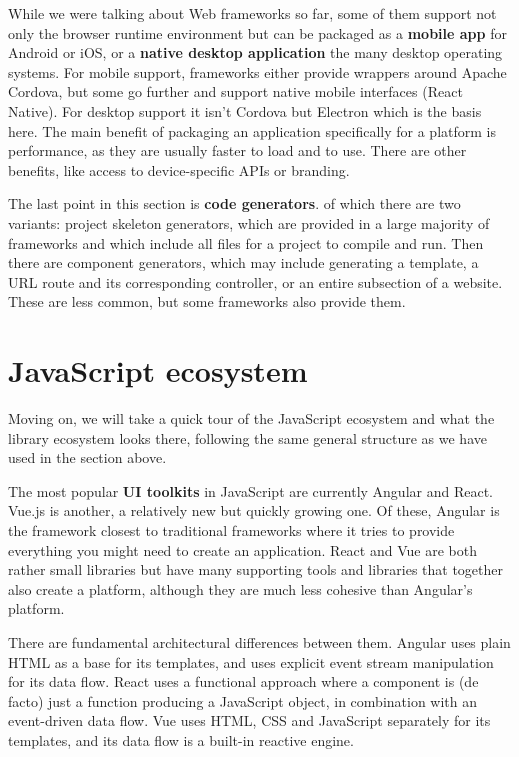 \documentclass[english,odsaz]{fitthesis}
\begin{document}
While we were talking about Web frameworks so far, some of them support not only
the browser runtime environment but can be packaged as a \textbf{mobile app} for Android
or iOS, or a \textbf{native desktop application} the many desktop operating systems. For
mobile support, frameworks either provide wrappers around Apache Cordova, but
some go further and support native mobile interfaces (React Native). For desktop
support it isn't Cordova but Electron which is the basis here. The main benefit
of packaging an application specifically for a platform is performance, as they
are usually faster to load and to use. There are other benefits, like access to
device-specific APIs or branding.

The last point in this section is \textbf{code generators}. of which there are two
variants: project skeleton generators, which are provided in a large majority of
frameworks and which include all files for a project to compile and run. Then
there are component generators, which may include generating a template, a URL
route and its corresponding controller, or an entire subsection of a
website. These are less common, but some frameworks also provide them.

\section{JavaScript ecosystem}
\label{sec:orgf30440d}
Moving on, we will take a quick tour of the JavaScript ecosystem and what the
library ecosystem looks there, following the same general structure as we have
used in the section above.

The most popular \textbf{UI toolkits} in JavaScript are currently Angular and
React. Vue.js is another, a relatively new but quickly growing one. Of these,
Angular is the framework closest to traditional frameworks where it tries to
provide everything you might need to create an application. React and Vue are
both rather small libraries but have many supporting tools and libraries that
together also create a platform, although they are much less cohesive than Angular's
platform.

There are fundamental architectural differences between them. Angular uses plain
HTML as a base for its templates, and uses explicit event stream manipulation
for its data flow. React uses a functional approach where a component is (de
facto) just a function producing a JavaScript object, in combination with an
event-driven data flow. Vue uses HTML, CSS and JavaScript separately for its
templates, and its data flow is a built-in reactive engine.
\end{document}
